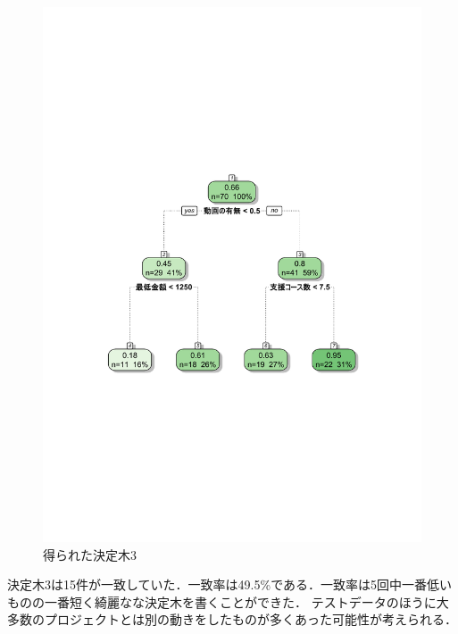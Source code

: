 \begin{figure}[H]
\centering
\includegraphics[width=13cm]{figure25.pdf}
\caption{得られた決定木3}\label{sannp}
\end{figure}


決定木3は15件が一致していた．一致率は49.5\%である．一致率は5回中一番低いものの一番短く綺麗なな決定木を書くことができた．
テストデータのほうに大多数のプロジェクトとは別の動きをしたものが多くあった可能性が考えられる．

